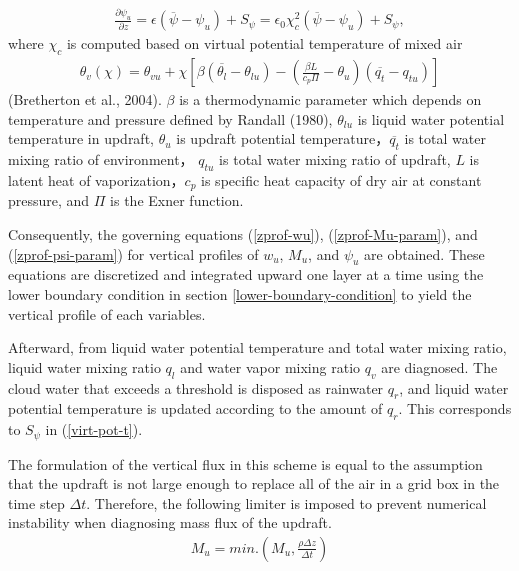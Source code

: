 \begin{eqnarray}
\frac{\partial \psi_u}{\partial z} = \epsilon (\overline{\psi}-\psi_u) + S_{\psi} = \epsilon_0\chi_c^2(\overline{\psi}-\psi_u) + S_{\psi}, \label{zprof-psi-param}\end{eqnarray} where \(\chi_c\) is computed based on
virtual potential temperature of mixed air \begin{eqnarray}\label{virt-pot-t}
    \theta_v(\chi)=\theta_{vu}+\chi\left[ \beta(\overline{\theta_l}-\theta_{lu})-\left(\frac{\beta L}{c_p\Pi}-\theta_u\right)(\overline{q_t}-q_{tu})\right]\end{eqnarray} (Bretherton et al., 2004). \(\beta\) is a
thermodynamic parameter which depends on temperature and pressure defined by Randall (1980), \(\theta_{lu}\) is liquid water potential temperature in updraft, \(\theta_u\) is updraft potential
temperature，\(\overline{q_t}\) is total water mixing ratio of environment， \(q_{tu}\) is total water mixing ratio of updraft, \(L\) is latent heat of vaporization，\(c_p\) is specific heat capacity
of dry air at constant pressure, and \(\Pi\) is the Exner function.

Consequently, the governing equations (\ref{zprof-wu}), (\ref{zprof-Mu-param}), and (\ref{zprof-psi-param}) for vertical profiles of \(w_u\),
\(M_u\), and \(\psi_u\) are obtained. These equations are discretized and integrated upward one layer at a time using the lower boundary condition in section \ref{lower-boundary-condition}
to yield the vertical profile of each variables.

Afterward, from liquid water potential temperature and total water mixing ratio, liquid water mixing ratio \(q_l\) and water vapor mixing ratio \(q_v\) are diagnosed. The cloud water that exceeds a
threshold is disposed as rainwater \(q_r\), and liquid water potential temperature is updated according to the amount of \(q_r\). This corresponds to \(S_\psi\) in (\ref{virt-pot-t}).

The formulation of the vertical flux in this scheme is equal to the assumption that the updraft is not large enough to replace all of the air in a grid box in the time step \(\Delta t\). Therefore,
the following limiter is imposed to prevent numerical instability when diagnosing mass flux of the updraft. \begin{eqnarray}\label{Mu-limit}
    M_u = min.\left(M_u, \frac{\rho\Delta z}{\Delta t}\right)\end{eqnarray}
